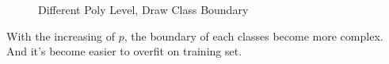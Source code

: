 \documentclass[12pt]{article}
\begin{document}
\begin{enumerate}
    \begin{figure}[H]
        \centering
        \caption{Different Poly Level, Draw Class Boundary}
        \label{Fig.lable}
    \end{figure}
    
    With the increasing of $p$, the boundary of each classes become more complex. And it's become easier to overfit on training set.

\end{enumerate}
\end{document}
